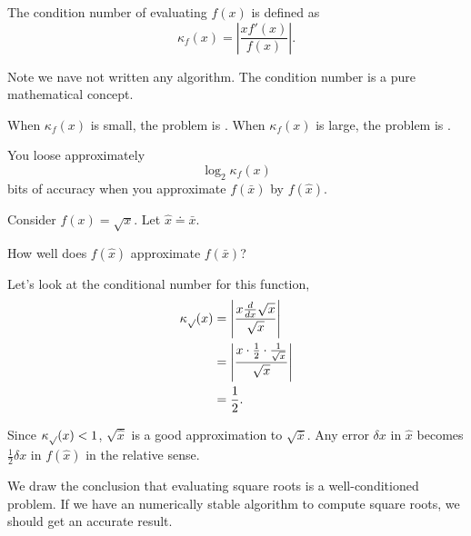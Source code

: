 \begin{definition}
    The condition number of evaluating \( f(x) \) is defined as \[
        \kappa_f(x) = \left| \frac{x f'(x)}{f(x)} \right|.
    \]
\end{definition}

\begin{remark}
    Note we nave not written any algorithm. The condition number is a pure mathematical concept.
\end{remark}

\begin{remark}
    When \( \kappa_f(x) \) is small, the problem is . When \( \kappa_f(x) \) is large, the problem is .
\end{remark}

\begin{remark}
    You loose approximately \[
        \log_2 \kappa_f(x)
    \] bits of accuracy when you approximate \( f(\bar{x}) \) by \( f(\hat{x}) \).
\end{remark}

\begin{example}
    Consider \( f(x) = \sqrt{x} \). Let \( \hat{x} \doteq \bar{{x}} \).

    How well does \( f(\hat{x}) \) approximate \( f(\bar{x}) \)?

    Let's look at the conditional number for this function, \begin{align*}
        \kappa_{\sqrt{\null}}(x)
         & = \left| \frac{x \frac{d}{dx} \sqrt{x}}{\sqrt{x}} \right|                      \\
         & = \left| \frac{x \cdot \frac{1}{2} \cdot \frac{1}{\sqrt{x}}}{\sqrt{x}} \right| \\
         & = \frac{1}{2}.
    \end{align*}

    Since \( \kappa_{\sqrt{\null}}(x) < 1 \), \( \sqrt{\hat{x}} \) is a good approximation to \( \sqrt{\bar{x}} \). Any error \( \delta x \) in \( \hat{x} \) becomes \( \frac{1}{2} \delta x \) in \( f(\hat{x}) \) in the relative sense.

    We draw the conclusion that evaluating square roots is a well-conditioned problem. If we have an numerically stable algorithm to compute square roots, we should get an accurate result.
\end{example}